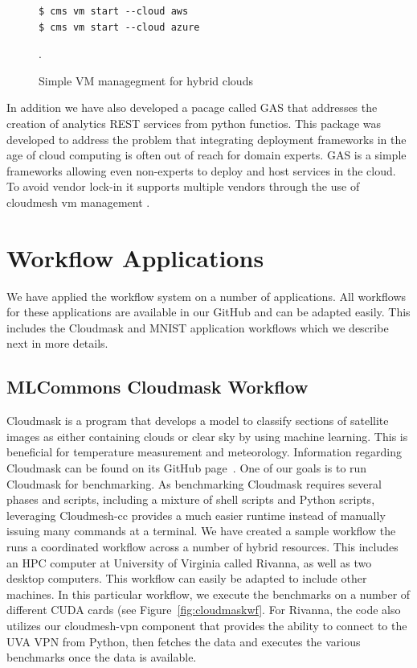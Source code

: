 \begin{figure}[htb]

\begin{verbatim}
$ cms vm start --cloud aws
$ cms vm start --cloud azure
\end{verbatim}

  \caption{Simple VM managegment for hybrid clouds}
\label{fig:cms}.
\end{figure}  

In addition we have also developed a pacage called GAS that addresses the creation of analytics REST services from python functios. This package was developed to address the problem that integrating deployment frameworks in the age of cloud computing is often out of reach for domain experts.  GAS is a simple frameworks allowing even non-experts to deploy and host services in the cloud. To avoid vendor lock-in it supports multiple vendors through the use of cloudmesh vm management \cite{las21-gas}.


% 

\section{Workflow Applications}

We have applied the workflow system on a number of applications. All workflows for these applications are available in our GitHub and can be adapted easily.
This includes the Cloudmask and MNIST application workflows which we describe next in more details.




% 


\subsection{MLCommons Cloudmask Workflow}
\label{cloudmask-workflow}

Cloudmask is a program that develops a model to classify sections of
satellite images as either containing clouds or clear sky by using
machine learning. This is beneficial for temperature measurement and
meteorology.  Information regarding Cloudmask can be found on its
GitHub page~\cite{www-cloudmask}.  One of our goals is to run
Cloudmask for benchmarking.  As benchmarking Cloudmask requires
several phases and scripts, including a mixture of shell scripts and
Python scripts, leveraging Cloudmesh-cc provides a much easier runtime
instead of manually issuing many commands at a terminal.  We have
created a sample workflow the runs a coordinated workflow across a
number of hybrid resources. This includes an HPC computer at
University of Virginia called Rivanna, as well as two desktop
computers. This workflow can easily be adapted to include other machines. In this
particular workflow, we execute the benchmarks on a number of
different CUDA cards (see Figure~\ref{fig:cloudmaskwf}. For Rivanna,
the code also utilizes our cloudmesh-vpn component that provides the
ability to connect to the UVA VPN from Python, then fetches the data
and executes the various benchmarks once the data is available.

